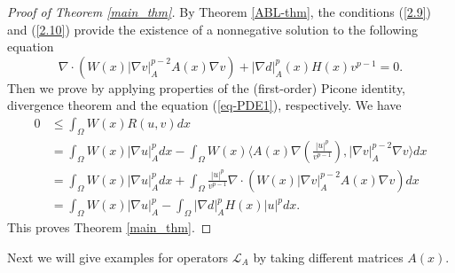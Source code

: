 \documentclass[a4paper,12pt,reqno]{amsart}
\renewcommand\eqref[1]{(\ref{#1})} %
\theoremstyle{theorem}
\numberwithin{equation}{section}
\theoremstyle{plain}
\theoremstyle{definition}
\theoremstyle{defi}
\begin{document}
\begin{proof}[Proof of Theorem \ref{main_thm}]
	By Theorem \ref{ABL-thm}, the conditions \eqref{2.9} and \eqref{2.10} provide the existence of a nonnegative solution to the following equation 
	\begin{equation}\label{eq-PDE1}
	\nabla \cdot (W(x) |\nabla v|^{p-2}_A A(x)\nabla v)+ |\nabla d|^p_A(x)H(x) v^{p-1} = 0.
	\end{equation}
	Then we prove by applying properties of the (first-order) Picone identity, divergence theorem and the equation \eqref{eq-PDE1}, respectively. We have  
	\begin{align*}
			0&\leq \int_{\Omega} W(x) R(u,v) dx\\
			&= \int_{\Omega} W(x)|\nabla u|^p_A dx - \int_{\Omega} W(x)  \langle A(x)\nabla\left(\frac{|u|^p}{v^{p-1}} \right), |\nabla v|^{p-2}_A\nabla v \rangle dx \\
			& = \int_{\Omega} W(x)|\nabla u|^p_A dx+ \int_{\Omega} \frac{|u|^p}{v^{p-1}} \nabla \cdot (W(x) |\nabla v|^{p-2}_A A(x)\nabla v)dx \\
			& =   \int_{\Omega} W(x)|\nabla u|^p_A - \int_{\Omega} |\nabla d|^p_AH(x) |u|^p dx.
	\end{align*}
This proves Theorem \ref{main_thm}.
\end{proof}

Next we will give examples for operators $\mathcal{L}_A$ by taking different matrices $A(x)$.

\bigskip
\end{document}
